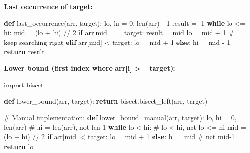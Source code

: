 \documentclass[11pt]{article}
\newenvironment{Shaded}{\begin{snugshade}}{\end{snugshade}}
\newcommand{\BuiltInTok}[1]{\textcolor[rgb]{0.50,0.55,0.55}{#1}}
\newcommand{\CommentTok}[1]{\textcolor[rgb]{0.48,0.49,0.49}{#1}}
\newcommand{\ControlFlowTok}[1]{\textcolor[rgb]{0.99,0.74,0.29}{\textbf{#1}}}
\newcommand{\DecValTok}[1]{\textcolor[rgb]{0.96,0.45,0.00}{#1}}
\newcommand{\ImportTok}[1]{\textcolor[rgb]{0.15,0.68,0.38}{#1}}
\newcommand{\KeywordTok}[1]{\textcolor[rgb]{0.81,0.81,0.76}{\textbf{#1}}}
\newcommand{\NormalTok}[1]{\textcolor[rgb]{0.81,0.81,0.76}{#1}}
\newcommand{\OperatorTok}[1]{\textcolor[rgb]{0.81,0.81,0.76}{#1}}
\begin{document}
\textbf{Last occurrence of target:}


\begin{Shaded}
\begin{Highlighting}[]
\KeywordTok{def}\NormalTok{ last\_occurrence(arr, target):}
\NormalTok{    lo, hi }\OperatorTok{=} \DecValTok{0}\NormalTok{, }\BuiltInTok{len}\NormalTok{(arr) }\OperatorTok{{-}} \DecValTok{1}
\NormalTok{    result }\OperatorTok{=} \OperatorTok{{-}}\DecValTok{1}
    \ControlFlowTok{while}\NormalTok{ lo }\OperatorTok{\textless{}=}\NormalTok{ hi:}
\NormalTok{        mid }\OperatorTok{=}\NormalTok{ (lo }\OperatorTok{+}\NormalTok{ hi) }\OperatorTok{//} \DecValTok{2}
        \ControlFlowTok{if}\NormalTok{ arr[mid] }\OperatorTok{==}\NormalTok{ target:}
\NormalTok{            result }\OperatorTok{=}\NormalTok{ mid}
\NormalTok{            lo }\OperatorTok{=}\NormalTok{ mid }\OperatorTok{+} \DecValTok{1}    \CommentTok{\# keep searching right}
        \ControlFlowTok{elif}\NormalTok{ arr[mid] }\OperatorTok{\textless{}}\NormalTok{ target:}
\NormalTok{            lo }\OperatorTok{=}\NormalTok{ mid }\OperatorTok{+} \DecValTok{1}
        \ControlFlowTok{else}\NormalTok{:}
\NormalTok{            hi }\OperatorTok{=}\NormalTok{ mid }\OperatorTok{{-}} \DecValTok{1}
    \ControlFlowTok{return}\NormalTok{ result}
\end{Highlighting}
\end{Shaded}

\textbf{Lower bound (first index where arr{[}i{]} \textgreater= target):}


\begin{Shaded}
\begin{Highlighting}[]
\ImportTok{import}\NormalTok{ bisect}

\KeywordTok{def}\NormalTok{ lower\_bound(arr, target):}
    \ControlFlowTok{return}\NormalTok{ bisect.bisect\_left(arr, target)}

\CommentTok{\# Manual implementation:}
\KeywordTok{def}\NormalTok{ lower\_bound\_manual(arr, target):}
\NormalTok{    lo, hi }\OperatorTok{=} \DecValTok{0}\NormalTok{, }\BuiltInTok{len}\NormalTok{(arr)   }\CommentTok{\# hi = len(arr), not len{-}1}
    \ControlFlowTok{while}\NormalTok{ lo }\OperatorTok{\textless{}}\NormalTok{ hi:          }\CommentTok{\# lo \textless{} hi, not lo \textless{}= hi}
\NormalTok{        mid }\OperatorTok{=}\NormalTok{ (lo }\OperatorTok{+}\NormalTok{ hi) }\OperatorTok{//} \DecValTok{2}
        \ControlFlowTok{if}\NormalTok{ arr[mid] }\OperatorTok{\textless{}}\NormalTok{ target:}
\NormalTok{            lo }\OperatorTok{=}\NormalTok{ mid }\OperatorTok{+} \DecValTok{1}
        \ControlFlowTok{else}\NormalTok{:}
\NormalTok{            hi }\OperatorTok{=}\NormalTok{ mid        }\CommentTok{\# not mid{-}1}
    \ControlFlowTok{return}\NormalTok{ lo}
\end{Highlighting}
\end{Shaded}
\end{document}
